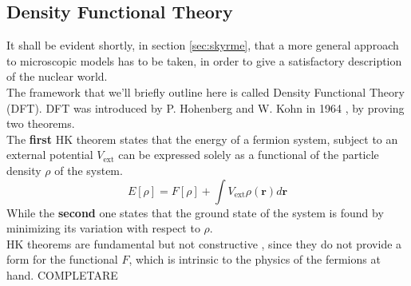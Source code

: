 \subsection{Density Functional Theory}
It shall be evident shortly, in section \ref{sec:skyrme}, that a more general approach to microscopic models has to be taken, in order to give a satisfactory description of the nuclear world.
\\The framework that we'll briefly outline here is called Density Functional Theory (DFT). DFT was introduced by P. Hohenberg and W. Kohn in 1964 \cite{HK}, by proving two theorems.
\\The \textbf{first} HK theorem states that the energy of a fermion system, subject to an external potential $V_\text{ext}$ can be expressed solely as a functional of the particle density $\rho$ of the system.
\begin{equation}
    \label{eq:hk_theorem1}
    E[\rho] = F[\rho] + \int V_\text{ext} \rho(\bm r) d\mathbf r
\end{equation}
While the \textbf{second} one states that the ground state of the system is found by minimizing its variation with respect to $\rho$. 
\\HK theorems are fundamental but not constructive \cite{NDFT}, since they do not provide a form for the functional $F$, which is intrinsic to the physics of the fermions at hand.
COMPLETARE



